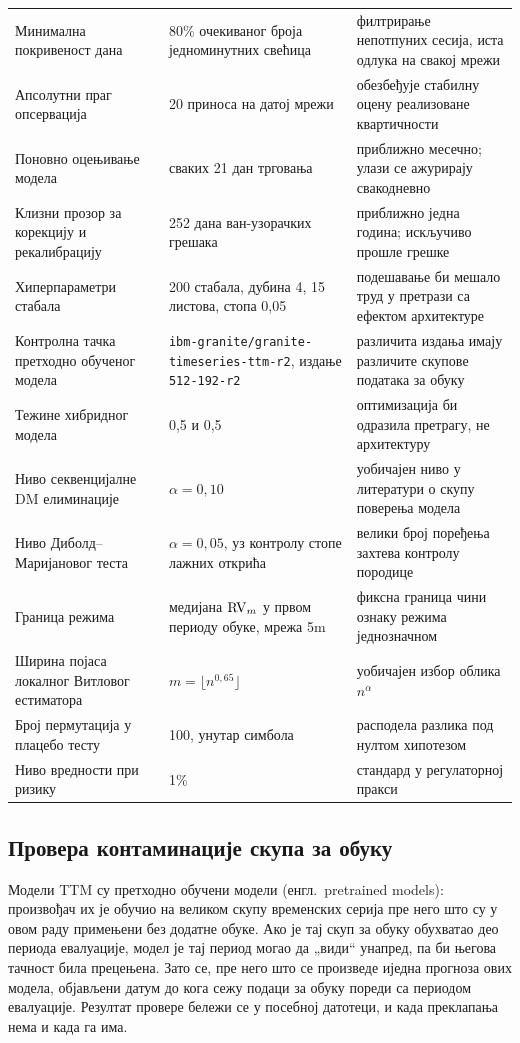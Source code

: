 \begin{center}
\begin{longtable}{L{4.4cm} L{3.4cm} L{5.2cm}}
Минимална покривеност дана & 80\% очекиваног броја једноминутних свећица & филтрирање непотпуних сесија, иста одлука на свакој мрежи \\
Апсолутни праг опсервација & 20 приноса на датој мрежи & обезбеђује стабилну оцену реализоване квартичности \\
Поновно оцењивање модела & сваких 21 дан трговања & приближно месечно; улази се ажурирају свакодневно \\
Клизни прозор за корекцију и рекалибрацију & 252 дана ван-узорачких грешака & приближно једна година; искључиво прошле грешке \\
Хиперпараметри стабала & 200 стабала, дубина 4, 15 листова, стопа 0,05 & подешавање би мешало труд у претрази са ефектом архитектуре \\
Контролна тачка претходно обученог модела & \texttt{ibm-granite/\allowbreak granite-\allowbreak timeseries-\allowbreak ttm-r2}, издање \texttt{512-192-r2} & различита издања имају различите скупове података за обуку \\
Тежине хибридног модела & 0,5 и 0,5 & оптимизација би одразила претрагу, не архитектуру \\
Ниво секвенцијалне DM елиминације & $\alpha = 0{,}10$ & уобичајен ниво у литератури о скупу поверења модела \\
Ниво Диболд–Маријановог теста & $\alpha = 0{,}05$, уз контролу стопе лажних открића & велики број поређења захтева контролу породице \\
Граница режима & медијана $\mathrm{RV}_m$ у првом периоду обуке, мрежа 5m & фиксна граница чини ознаку режима једнозначном \\
Ширина појаса локалног Витловог естиматора & $m = \lfloor n^{0{,}65}\rfloor$ & уобичајен избор облика $n^{\alpha}$ \\
Број пермутација у плацебо тесту & 100, унутар симбола & расподела разлика под нултом хипотезом \\
Ниво вредности при ризику & 1\% & стандард у регулаторној пракси \\
\end{longtable}
\end{center}

\subsection{Провера контаминације скупа за обуку}
\label{subsec:kontaminacija}

Модели TTM су претходно обучени модели (енгл.\ pretrained models): произвођач их је
обучио на великом скупу временских серија пре него што су у овом раду примењени без
додатне обуке. Ако је тај скуп за обуку обухватао део периода евалуације, модел је тај
период могао да „види“ унапред, па би његова тачност била прецењена. Зато се, пре него
што се произведе иједна прогноза ових модела, објављени датум до кога сежу подаци за
обуку пореди са периодом евалуације. Резултат провере бележи се у посебној датотеци, и
када преклапања нема и када га има.

